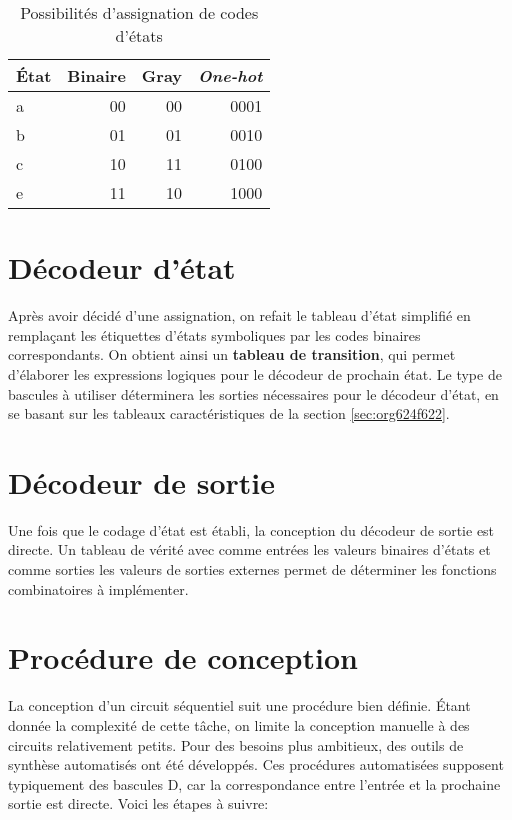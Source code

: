 \documentclass[letter, oneside]{book}
\begin{document}
\begin{table}[htbp]
\caption{\label{tab:orgcfb3ed8}Possibilités d'assignation de codes d'états}
\centering
\begin{tabular}{lrrr}
État & Binaire & Gray & \emph{One-hot}\\[0pt]
\hline
a & 00 & 00 & 0001\\[0pt]
b & 01 & 01 & 0010\\[0pt]
c & 10 & 11 & 0100\\[0pt]
e & 11 & 10 & 1000\\[0pt]
\end{tabular}
\end{table}

\section{Décodeur d'état}
\label{sec:org170c4cc}

Après avoir décidé d'une assignation, on refait le tableau d'état
simplifié en remplaçant les étiquettes d'états symboliques par les
codes binaires correspondants. On obtient ainsi un \textbf{tableau de
transition}, qui permet d'élaborer les expressions logiques pour le
décodeur de prochain état. Le type de bascules à utiliser déterminera
les sorties nécessaires pour le décodeur d'état, en se basant sur les
tableaux caractéristiques de la section \ref{sec:org624f622}.

\section{Décodeur de sortie}
\label{sec:org144894c}

Une fois que le codage d'état est établi, la conception du décodeur de
sortie est directe. Un tableau de vérité avec comme entrées les
valeurs binaires d'états et comme sorties les valeurs de sorties
externes permet de déterminer les fonctions combinatoires à
implémenter.

\section{Procédure de conception}
\label{sec:orgdbdada4}

La conception d'un circuit séquentiel suit une procédure bien
définie. Étant donnée la complexité de cette tâche, on limite la
conception manuelle à des circuits relativement petits. Pour des
besoins plus ambitieux, des outils de synthèse automatisés ont été
développés. Ces procédures automatisées supposent typiquement des
bascules D, car la correspondance entre l'entrée et la prochaine
sortie est directe. Voici les étapes à suivre:
\end{document}
